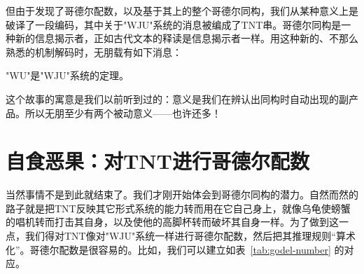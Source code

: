 但由于发现了哥德尔配数，以及基于其上的整个哥德尔同构，我们从某种意义上是破译了一段编码，其中关于"WJU"系统的消息被编成了TNT串。哥德尔同构是一种新的信息揭示者，正如古代文本的释读是信息揭示者一样。用这种新的、不那么熟悉的机制解码时，无朋载有如下消息：

\begin{block}
"WU"是"WJU"系统的定理。
\end{block}

这个故事的寓意是我们以前听到过的：意义是我们在辨认出同构时自动出现的副产品。所以无朋至少有两个被动意义——也许还多！

\section{自食恶果：对TNT进行哥德尔配数}

当然事情不是到此就结束了。我们才刚开始体会到哥德尔同构的潜力。自然而然的路子就是把TNT反映其它形式系统的能力转而用在它自己身上，就像乌龟使螃蟹的唱机转而打击其自身，以及使他的高脚杯转而破坏其自身一样。为了做到这一点，我们得对TNT像对"WJU"系统一样进行哥德尔配数，然后把其推理规则“算术化”。哥德尔配数是很容易的。比如，我们可以建立如表~\ref{tab:godel-number} 的对应。

